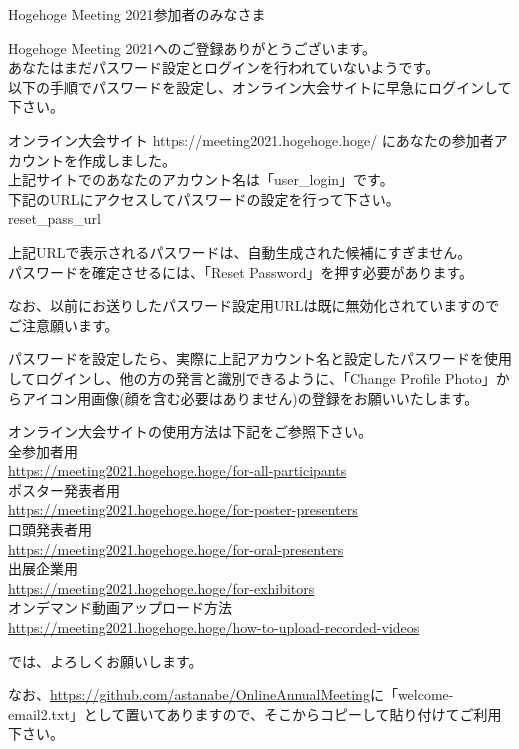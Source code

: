 \documentclass[titlepage,10pt,a4paper,uplatex]{jsbook}
\newenvironment{content}{\begin{shaded}\vspace{-1em}\raggedright\ttfamily\footnotesize\setlength{\baselineskip}{1.4em}}{\end{shaded}\vspace{-1em}}
\begin{document}
\begin{content}
Hogehoge Meeting 2021参加者のみなさま

Hogehoge Meeting 2021へのご登録ありがとうございます。\\
あなたはまだパスワード設定とログインを行われていないようです。\\
以下の手順でパスワードを設定し、オンライン大会サイトに早急にログインして下さい。

オンライン大会サイト https://meeting2021.hogehoge.hoge/ にあなたの参加者アカウントを作成しました。\\
上記サイトでのあなたのアカウント名は「{\lbrack}user\_login{\rbrack}」です。\\
下記のURLにアクセスしてパスワードの設定を行って下さい。\\
{\lbrack}reset\_pass\_url{\rbrack}

上記URLで表示されるパスワードは、自動生成された候補にすぎません。\\
パスワードを確定させるには、「Reset Password」を押す必要があります。

なお、以前にお送りしたパスワード設定用URLは既に無効化されていますのでご注意願います。

パスワードを設定したら、実際に上記アカウント名と設定したパスワードを使用してログインし、他の方の発言と識別できるように、「Change Profile Photo」からアイコン用画像(顔を含む必要はありません)の登録をお願いいたします。

オンライン大会サイトの使用方法は下記をご参照下さい。\\
全参加者用\\
\url{https://meeting2021.hogehoge.hoge/for-all-participants}\\
ポスター発表者用\\
\url{https://meeting2021.hogehoge.hoge/for-poster-presenters}\\
口頭発表者用\\
\url{https://meeting2021.hogehoge.hoge/for-oral-presenters}\\
出展企業用\\
\url{https://meeting2021.hogehoge.hoge/for-exhibitors}\\
オンデマンド動画アップロード方法\\
\url{https://meeting2021.hogehoge.hoge/how-to-upload-recorded-videos}

では、よろしくお願いします。
\end{content}

なお、\url{https://github.com/astanabe/OnlineAnnualMeeting}に「welcome-email2.txt」として置いてありますので、そこからコピーして貼り付けてご利用下さい。
\end{document}
